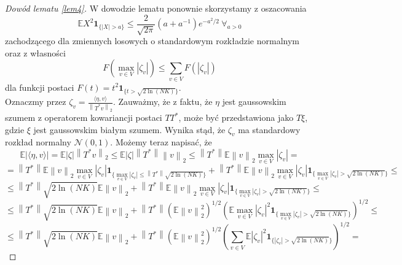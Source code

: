 \documentclass{mwart}
\newcommand{\norm}[1]{\left\lVert#1\right\rVert}
\begin{document}
\begin{proof}[Dowód lematu \ref{lem4}]
W dowodzie lematu ponownie skorzystamy z oszacowania 
\begin{displaymath}
\mathbb{E}X^2\pmb{1}_{\{|X|>a\}}\leq \frac{2}{\sqrt{2\pi}}(a+a^{-1})e^{-a^2/2}\ \forall_{a>0}
\end{displaymath}
zachodzącego dla zmiennych losowych o standardowym rozkładzie normalnym oraz z własności
\begin{displaymath}
F(\max_{v\in V}|\zeta_v|)\leq \sum_{v\in V}F(|\zeta_v|)
\end{displaymath}
dla funkcji postaci $F(t)=t^2\pmb{1}_{\{t> \sqrt{2\ln (NK)}\}}$.\\
Oznaczmy przez $\zeta_v=\frac{\langle \eta ,v\rangle}{\norm{T^*v}_2}$. Zauważmy, że z faktu, że $\eta$ jest gaussowskim  szumem  z operatorem kowariancji postaci $TT^*$, może być przedstawiona jako $T\xi$, gdzie $\xi$ jest gaussowskim białym szumem. Wynika stąd, że $\zeta_v$ ma standardowy rozkład normalny $\mathcal{N}(0,1)$. Możemy teraz napisać, że
\begin{displaymath}
\mathbb{E}\left|\langle \eta , v\rangle\right|=\mathbb{E}|\zeta |\norm{T^*v}_2\leq\mathbb{E}|\zeta |\norm{T^*}\norm{v}_2\leq \norm{T^*} \mathbb{E}\norm{v}_2\max_{v\in V}|\zeta_v|=
\end{displaymath}
\begin{displaymath}
=\norm{T^*}\mathbb{E}\norm{v}_2\max_{v\in V}|\zeta_v|\pmb{1}_{\{\max_{v\in V}|\zeta_v|\leq \norm{T^*}\sqrt{2\ln (NK)}\}}+\norm{T^*}\mathbb{E}\norm{v}_2\max_{v\in V}|\zeta_v|\pmb{1}_{\{\max_{v\in V}|\zeta_v|> \sqrt{2\ln (NK)}\}}\leq
\end{displaymath}
\begin{displaymath}
\leq \norm{T^*}\sqrt{2\ln (NK)}\mathbb{E}\norm{v}_2+\norm{T^*}\mathbb{E}\norm{v}_2\max_{v\in V}|\zeta_v|\pmb{1}_{\{\max_{v\in V}|\zeta_v|> \sqrt{2\ln (NK)}\}}\leq
\end{displaymath}
\begin{displaymath}
\leq \norm{T^*}\sqrt{2\ln (NK)}\mathbb{E}\norm{v}_2+\norm{T^*}\left(\mathbb{E}\norm{v}_2^2\right)^{1/2}\left(\mathbb{E}\max_{v\in V}|\zeta_v|^2\pmb{1}_{\{\max_{v\in V}|\zeta_v|> \sqrt{2\ln (NK)}\}}\right)^{1/2}\leq
\end{displaymath}
\begin{displaymath}
\leq \norm{T^*}\sqrt{2\ln (NK)}\mathbb{E}\norm{v}_2+\norm{T^*}\left(\mathbb{E}\norm{v}_2^2\right)^{1/2}\left(\sum_{v\in V}\mathbb{E}|\zeta_v|^2\pmb{1}_{\{|\zeta_v|> \sqrt{2\ln (NK)}\}}\right)^{1/2}=
\end{displaymath}

\end{proof}
\end{document}
